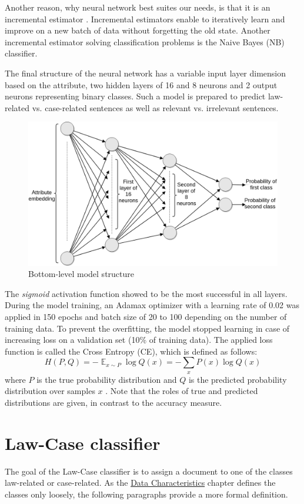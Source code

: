 \documentclass[
  digital, %
  notable,   %
  nolof,     %
  nolot,     %
]{fithesis3}
\DeclareMathOperator{\EX}{\mathbb{E}}%
\begin{document}
Another reason, why neural network best suites our needs, is that it is an incremental estimator \cite{incrementalScikit}.
Incremental estimators enable to iteratively learn and improve on a new batch of data without forgetting the old state.
Another incremental estimator solving classification problems is the Naive Bayes (NB) classifier.

The final structure of the neural network has a variable input layer dimension based on the attribute, two hidden layers of 16 and 8 neurons and 2 output neurons representing binary classes.
Such a model is prepared to predict law-related vs. case-related sentences as well as relevant vs. irrelevant sentences.

\begin{figure}[H]
\caption{Bottom-level model structure}
\label{fig:neural-network}
\includegraphics[width=\textwidth]{img/Bottom-level_NN}
\end{figure}

The \textit{sigmoid} activation function showed to be the most successful in all layers.
During the model training, an Adamax optimizer with a learning rate of 0.02 was applied in 150 epochs and batch size of 20 to 100 depending on the number of training data.
To prevent the overfitting, the model stopped learning in case of increasing loss on a validation set (10\% of training data).
The applied loss function is called the Cross Entropy (CE), which is defined as follows:
$$
H(P, Q) = -\EX_{x \sim P} \log{Q(x)} = -\sum_x P(x) \log{Q(x)}
$$
where $P$ is the true probability distribution and $Q$ is the predicted probability distribution over samples $x$ \cite{Goodfellow-et-al-2016}.
Note that the roles of true and predicted distributions are given, in contrast to the accuracy measure.

\section{Law-Case classifier}
\label{sec:law-case-classifier}
The goal of the Law-Case classifier is to assign a document to one of the classes law-related or case-related.
As the \hyperref[chp:data_characteristics]{Data Characteristics} chapter defines the classes only loosely, the following paragraphs provide a more formal definition.
\end{document}
